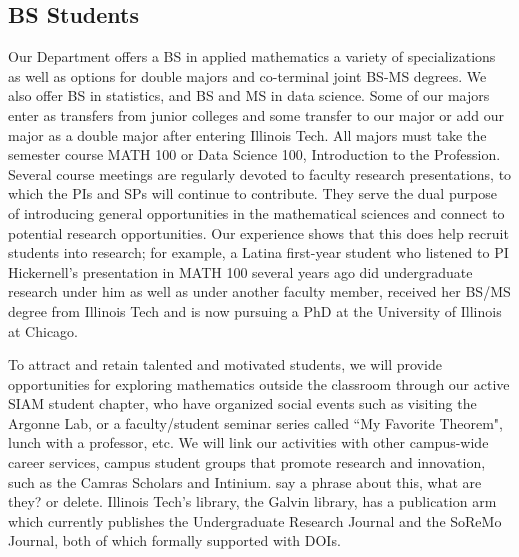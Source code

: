 \documentclass[11pt]{NSFamsart}
\begin{document}
{\subsection*{BS Students}
Our Department  offers a BS in applied mathematics a variety of specializations as well as options for double majors and co-terminal joint BS-MS degrees. We also offer BS in statistics, and BS and MS in data science.  Some of our majors enter as transfers from junior colleges and some transfer to our major or add our major as a double major after entering Illinois Tech.
All majors must take the semester course MATH 100 or Data Science 100, Introduction to the Profession. 
Several course meetings are regularly devoted to faculty research presentations, to which the PIs and SPs will continue to contribute. They serve the dual purpose of introducing general opportunities in the mathematical sciences and connect to potential research opportunities. Our experience shows that this does help recruit students into research; for example, %
a Latina first-year student who listened to PI Hickernell's presentation in MATH 100 several years ago did undergraduate research under him as well as under another faculty member, received her BS/MS degree from Illinois Tech and is now pursuing a PhD at the University of Illinois at Chicago.

To attract and retain talented and motivated students, we will provide opportunities for exploring mathematics outside the classroom through our active  SIAM student chapter, who have organized social events such as visiting the Argonne Lab, or a faculty/student seminar series called ``My Favorite Theorem", lunch with a professor, etc. 
We will link our activities with other campus-wide career services, campus student groups that promote research and innovation, such as the Camras Scholars and Intinium. {\color{red}say a phrase about this, what are they? or delete.}
Illinois Tech's library, the Galvin library, has a publication arm which currently publishes the Undergraduate Research Journal  and the SoReMo Journal, both of which formally supported with DOIs. 

}
\end{document}
